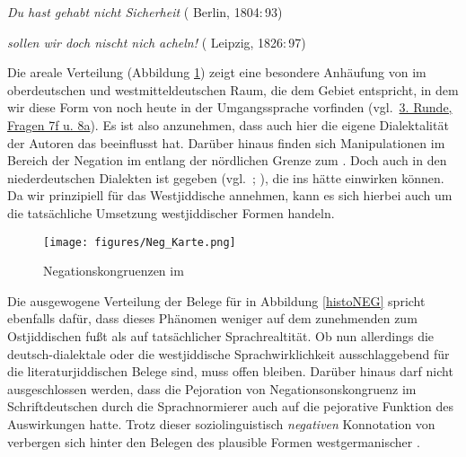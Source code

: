 {%
 \item \textit{Du hast gehabt nicht Sicherheit} ( Berlin, 1804:\,93) \\
\label{negchrlijinicht}



 \item \textit{sollen wir doch nischt nich acheln!} ( Leipzig, 1826:\,97)\\
\label{negchrlijinichtsnicht}

 }

Die areale Verteilung (Abbildung \ref{KarteNeg}) zeigt eine besondere Anhäufung von  im oberdeutschen und westmitteldeutschen Raum, die dem Gebiet entspricht, in dem wir \mbox{diese} Form von  noch heute in der Umgangssprache vorfinden (vgl.\,  \href{http://www.atlas-alltagssprache.de/runde-3/f07f-f08a/}{3. Runde, Fragen 7f u. 8a}). Es ist also anzunehmen, dass auch hier die eigene Dialektalität der Autoren das  beeinflusst hat. Darüber hinaus finden sich Manipulationen im Bereich der Negation im  entlang der nördlichen Grenze zum . Doch auch in den niederdeutschen Dialekten ist  gegeben (vgl.\, \citealt{Breitbarth2013}; \citealt[76]{Reershemius2004}), die ins  hätte einwirken können. Da wir prinzipiell  für das Westjiddische annehmen, kann es sich hierbei auch um die tatsächliche Umsetzung westjiddischer Formen handeln. 


\begin{figure}
\centering
\texttt{[image: figures/Neg\_Karte.png]}
		\caption{\label{KarteNeg}Negationskongruenzen im }
	\end{figure}
  
 
 
Die ausgewogene Verteilung der Belege für  in Abbildung \ref{histoNEG} spricht ebenfalls dafür, dass dieses Phänomen weniger auf dem zunehmenden  zum Ostjiddischen fußt als auf tatsächlicher Sprachrealtität. Ob nun allerdings die deutsch-dialektale oder die westjiddische Sprachwirklichkeit ausschlaggebend für die literaturjiddischen Belege sind, muss offen bleiben. Darüber hinaus darf nicht ausgeschlossen werden, dass die Pejoration von Negationsonskongruenz im Schriftdeutschen durch die Sprachnormierer auch auf die pejorative Funktion des  Auswirkungen hatte. Trotz dieser soziolinguistisch \textit{negativen} Konnotation von  verbergen sich hinter den Belegen des  plausible Formen westgermanischer . 

